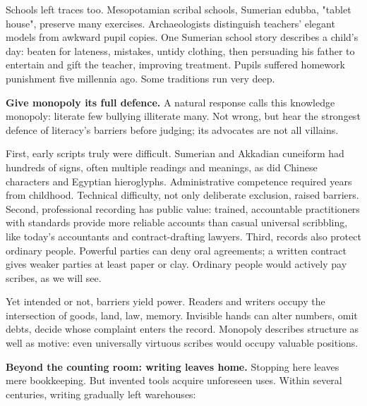 Schools left traces too. Mesopotamian scribal schools, Sumerian edubba, "tablet house", preserve many exercises. Archaeologists distinguish teachers' elegant models from awkward pupil copies. One Sumerian school story describes a child's day: beaten for lateness, mistakes, untidy clothing, then persuading his father to entertain and gift the teacher, improving treatment. Pupils suffered homework punishment five millennia ago. Some traditions run very deep.

\textbf{Give monopoly its full defence.} A natural response calls this knowledge monopoly: literate few bullying illiterate many. Not wrong, but hear the strongest defence of literacy's barriers before judging; its advocates are not all villains.

First, early scripts truly were difficult. Sumerian and Akkadian cuneiform had hundreds of signs, often multiple readings and meanings, as did Chinese characters and Egyptian hieroglyphs. Administrative competence required years from childhood. Technical difficulty, not only deliberate exclusion, raised barriers. Second, professional recording has public value: trained, accountable practitioners with standards provide more reliable accounts than casual universal scribbling, like today's accountants and contract-drafting lawyers. Third, records also protect ordinary people. Powerful parties can deny oral agreements; a written contract gives weaker parties at least paper or clay. Ordinary people would actively pay scribes, as we will see.

Yet intended or not, barriers yield power. Readers and writers occupy the intersection of goods, land, law, memory. Invisible hands can alter numbers, omit debts, decide whose complaint enters the record. Monopoly describes structure as well as motive: even universally virtuous scribes would occupy valuable positions.

\textbf{Beyond the counting room: writing leaves home.} Stopping here leaves mere bookkeeping. But invented tools acquire unforeseen uses. Within several centuries, writing gradually left warehouses:

